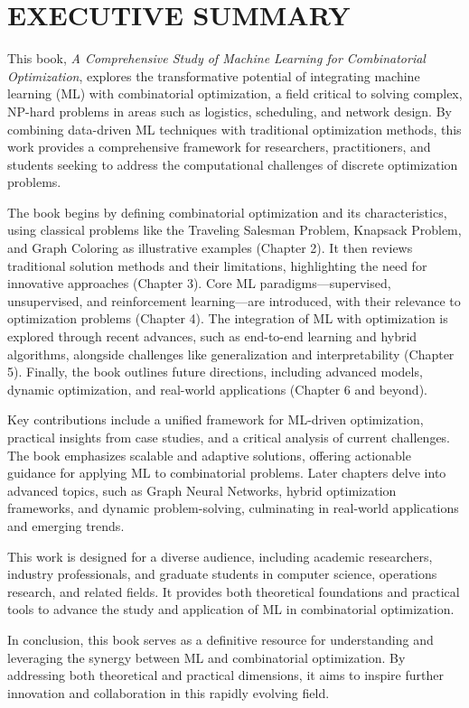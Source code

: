 \chapter*{\MakeUppercase{Executive Summary}}

This book, \emph{A Comprehensive Study of Machine Learning for Combinatorial Optimization}, explores the transformative potential of integrating machine learning (ML) with combinatorial optimization, a field critical to solving complex, NP-hard problems in areas such as logistics, scheduling, and network design. By combining data-driven ML techniques with traditional optimization methods, this work provides a comprehensive framework for researchers, practitioners, and students seeking to address the computational challenges of discrete optimization problems.

The book begins by defining combinatorial optimization and its characteristics, using classical problems like the Traveling Salesman Problem, Knapsack Problem, and Graph Coloring as illustrative examples (Chapter 2). It then reviews traditional solution methods and their limitations, highlighting the need for innovative approaches (Chapter 3). Core ML paradigms—supervised, unsupervised, and reinforcement learning—are introduced, with their relevance to optimization problems (Chapter 4). The integration of ML with optimization is explored through recent advances, such as end-to-end learning and hybrid algorithms, alongside challenges like generalization and interpretability (Chapter 5). Finally, the book outlines future directions, including advanced models, dynamic optimization, and real-world applications (Chapter 6 and beyond).

Key contributions include a unified framework for ML-driven optimization, practical insights from case studies, and a critical analysis of current challenges. The book emphasizes scalable and adaptive solutions, offering actionable guidance for applying ML to combinatorial problems. Later chapters delve into advanced topics, such as Graph Neural Networks, hybrid optimization frameworks, and dynamic problem-solving, culminating in real-world applications and emerging trends.

This work is designed for a diverse audience, including academic researchers, industry professionals, and graduate students in computer science, operations research, and related fields. It provides both theoretical foundations and practical tools to advance the study and application of ML in combinatorial optimization.

In conclusion, this book serves as a definitive resource for understanding and leveraging the synergy between ML and combinatorial optimization. By addressing both theoretical and practical dimensions, it aims to inspire further innovation and collaboration in this rapidly evolving field.
